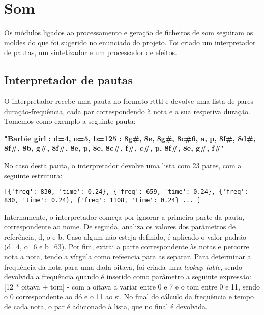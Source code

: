 \chapter{Som}
\label{chap.som}

Os módulos ligados ao processamento e geração de ficheiros de som seguiram os moldes do que foi sugerido no enunciado do projeto. Foi criado um interpretador de pautas, um sintetizador e um processador de efeitos.

\section{Interpretador de pautas}

O interpretador recebe uma pauta no formato \ac{rtttl} e devolve uma lista de pares duração-frequência, cada par correspondendo à nota e a sua respetiva duração. Tomemos como exemplo a seguinte pauta:

\vspace{5mm}
\textbf{"Barbie girl : d=4, o=5, b=125 : 8g\#, 8e, 8g\#, 8c\#6, a, p, 8f\#, 8d\#, 8f\#, 8b, g\#, 8f\#, 8e, p, 8e, 8c\#, f\#, c\#, p, 8f\#, 8e, g\#, f\#'}
\vspace{5mm}

No caso desta pauta, o interpretador devolve uma lista com 23 pares, com a seguinte estrutura:

\vspace{5mm}
\begin{lstlisting}
[{'freq': 830, 'time': 0.24}, {'freq': 659, 'time': 0.24}, {'freq': 830, 'time': 0.24}, {'freq': 1108, 'time': 0.24} ... ]
\end{lstlisting}
\vspace{5mm}

Internamente, o interpretador começa por ignorar a primeira parte da pauta, correspondente ao nome. De seguida, analiza os valores dos parâmetros de referência, d, o e b. Caso algum não esteja definido, é aplicado o valor padrão (d=4, o=6 e b=63). Por fim, extrai a parte correspondente às notas e percorre nota a nota, tendo a vírgula como refeencia para as separar. Para determinar a frequência da nota para uma dada oitava, foi criada uma \emph{lookup table}, sendo devolvida a frequência quando é inserido como parâmetro a seguinte expressão: [12 * oitava + tom] - com a oitava a variar entre 0 e 7 e o tom entre 0 e 11, sendo o 0 correspondente ao dó e o 11 ao si. No final do cálculo da frequência e tempo de cada nota, o par é adicionado à lista, que no final é devolvida.

